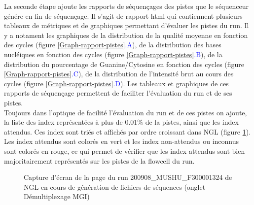La seconde étape ajoute les rapports de séquençages des pistes que le séquenceur génére en fin de séquençage.
Il s'agit de rapport html qui contiennent plusieurs tableaux de métriques et de graphiques permettant d'évaluer les pistes du run.
Il y a notament les graphiques de la distribution de la qualité moyenne en fonction des cycles (figure \ref{Graph-rapport-pistes}\textcolor{blue}{.A}), de la distribution des bases nucléiques en fonction des cycles (figure \ref{Graph-rapport-pistes}\textcolor{blue}{.B}), de la distribution du pourcentage de Guanine/Cytosine en fonction des cycles (figure \ref{Graph-rapport-pistes}\textcolor{blue}{.C}), de la distribution de l'intensité brut au cours des cycles (figure \ref{Graph-rapport-pistes}\textcolor{blue}{.D}).
Les tableaux et graphiques de ces rapports de séquençage permettent de faciliter l'évaluation du run et de ses pistes.\\

Toujours dans l'optique de facilité l'évaluation du run et de ces pistes on ajoute, la liste des index représentées à plus de 0.01\% de la pistes, ainsi que les index attendus.
Ces index sont triés et affichés par ordre croissant dans NGL (figure \ref{top-index}).
Les index attendus sont colorés en vert et les index non-attendus ou inconnus sont colorés en rouge, ce qui permet de vérifier que les index attendus sont bien majoritairement représentés sur les pistes de la flowcell du run.

\begin{figure}[H]
    \centering
    \caption{\footnotesize{Capture d'écran de la page du run 200908\_MUSHU\_F300001324 de NGL en cours de génération de fichiers de séquences (onglet \og Démultiplexage MGI\fg{})}}
    \label{top-index}
\end{figure}

